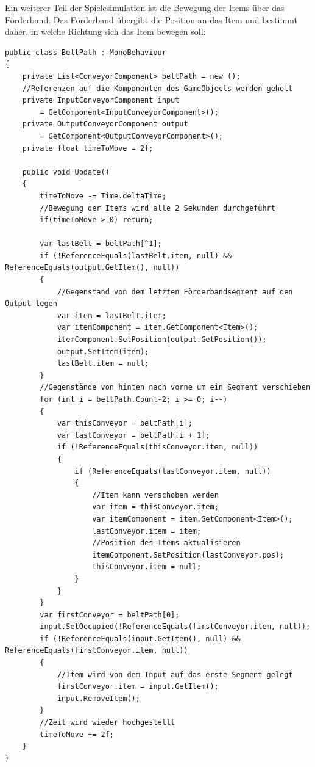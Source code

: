 Ein weiterer Teil der Spielesimulation ist die Bewegung der Items über das Förderband. Das Förderband übergibt die Position an das Item und bestimmt daher, in welche Richtung sich das Item bewegen soll:
\begin{lstlisting}[style=code, caption={Förderband Komponente OOP}]
public class BeltPath : MonoBehaviour
{
    private List<ConveyorComponent> beltPath = new ();
    //Referenzen auf die Komponenten des GameObjects werden geholt
    private InputConveyorComponent input 
        = GetComponent<InputConveyorComponent>();
    private OutputConveyorComponent output 
        = GetComponent<OutputConveyorComponent>();
    private float timeToMove = 2f;

    public void Update()
    {
        timeToMove -= Time.deltaTime;
        //Bewegung der Items wird alle 2 Sekunden durchgeführt
        if(timeToMove > 0) return;
        
        var lastBelt = beltPath[^1];
        if (!ReferenceEquals(lastBelt.item, null) && ReferenceEquals(output.GetItem(), null))
        {
            //Gegenstand von dem letzten Förderbandsegment auf den Output legen
            var item = lastBelt.item;
            var itemComponent = item.GetComponent<Item>();
            itemComponent.SetPosition(output.GetPosition());
            output.SetItem(item);
            lastBelt.item = null;
        }
        //Gegenstände von hinten nach vorne um ein Segment verschieben
        for (int i = beltPath.Count-2; i >= 0; i--)
        {
            var thisConveyor = beltPath[i];
            var lastConveyor = beltPath[i + 1];
            if (!ReferenceEquals(thisConveyor.item, null))
            {
                if (ReferenceEquals(lastConveyor.item, null))
                {
                    //Item kann verschoben werden
                    var item = thisConveyor.item;
                    var itemComponent = item.GetComponent<Item>();
                    lastConveyor.item = item;
                    //Position des Items aktualisieren
                    itemComponent.SetPosition(lastConveyor.pos);
                    thisConveyor.item = null;
                }
            }
        }
        var firstConveyor = beltPath[0];
        input.SetOccupied(!ReferenceEquals(firstConveyor.item, null));
        if (!ReferenceEquals(input.GetItem(), null) && ReferenceEquals(firstConveyor.item, null))
        {
            //Item wird von dem Input auf das erste Segment gelegt
            firstConveyor.item = input.GetItem();
            input.RemoveItem();
        }
        //Zeit wird wieder hochgestellt
        timeToMove += 2f;
    }
}
\end{lstlisting}

